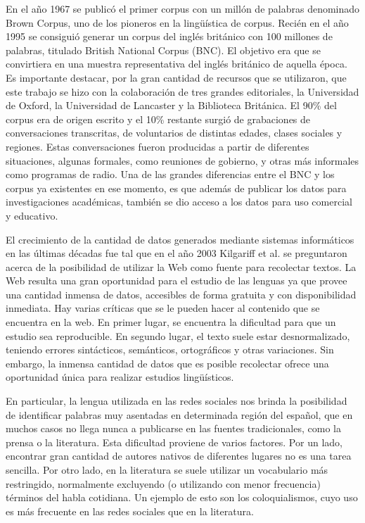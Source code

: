 En el año 1967 se publicó el primer corpus con un millón de palabras denominado Brown Corpus, uno de los pioneros en la lingüística de corpus. Recién en el año 1995 se consiguió generar un corpus del inglés británico con 100 millones de palabras, titulado British National Corpus (BNC). 
El objetivo era que se convirtiera en una muestra representativa del inglés británico de aquella época. 
Es importante destacar, por la gran cantidad de recursos que se utilizaron, que este trabajo se hizo con la colaboración de tres grandes editoriales, la Universidad de Oxford, la Universidad de Lancaster y la Biblioteca Británica. 
El 90\% del corpus era de origen escrito y el 10\% restante surgió de grabaciones de conversaciones transcritas, de voluntarios de distintas edades, clases sociales y regiones. 
Estas conversaciones fueron producidas a partir de diferentes situaciones, algunas formales, como reuniones de gobierno, y otras más informales como programas de radio. 
Una de las grandes diferencias entre el BNC y los corpus ya existentes en ese momento, es que además de publicar los datos para investigaciones académicas, también se dio acceso a los datos para uso comercial y educativo.

El crecimiento de la cantidad de datos generados mediante sistemas informáticos en las últimas décadas fue tal que en el año 2003 Kilgariff et al. \cite{kilgarriff2003introduction} se preguntaron acerca de la posibilidad de utilizar la Web como fuente para recolectar textos.
La Web resulta una gran oportunidad para el estudio de las lenguas ya que provee una cantidad inmensa de datos, accesibles de forma gratuita y con disponibilidad inmediata. Hay varias críticas que se le pueden hacer al contenido que se encuentra en la web. En primer lugar, se encuentra la dificultad para que un estudio sea reproducible. En segundo lugar, el texto suele estar desnormalizado, teniendo errores sintácticos, semánticos, ortográficos y otras variaciones. Sin embargo, la inmensa cantidad de datos que es posible recolectar ofrece una oportunidad única para realizar estudios lingüísticos.

En particular, la lengua utilizada en las redes sociales nos brinda la posibilidad de identificar palabras muy asentadas en determinada región del español, que en muchos casos no llega nunca a publicarse en las fuentes tradicionales, como la prensa o la literatura. Esta dificultad proviene de varios factores. Por un lado, encontrar gran cantidad de autores nativos de diferentes lugares no es una tarea sencilla. Por otro lado, en la literatura se suele utilizar un vocabulario más restringido, normalmente excluyendo (o utilizando con menor frecuencia) términos del habla cotidiana. Un ejemplo de esto son los coloquialismos, cuyo uso es más frecuente en las redes sociales que en la literatura. 

